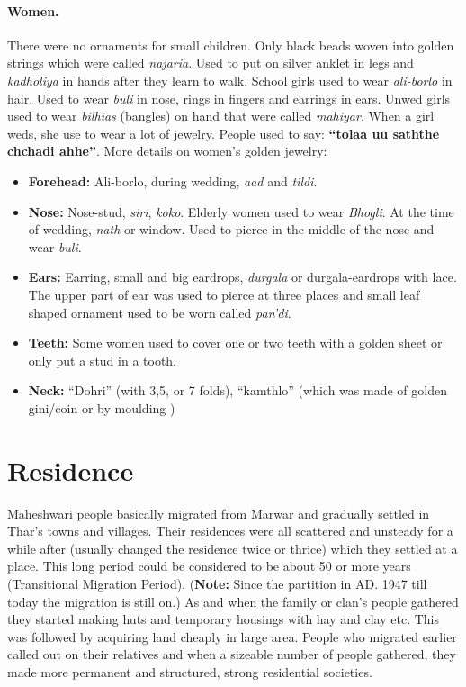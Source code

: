 \paragraph{Women.} There were no ornaments for small children. Only black beads
woven into golden strings which were called \textit{najaria}. Used to put on
silver anklet in legs and \textit{kadholiya} in hands after they learn to walk.
School girls used to wear \textit{ali-borlo} in hair. Used to wear \textit{buli}
in nose, rings in fingers and earrings in ears. Unwed girls used to wear
\textit{bilhias} (bangles) on hand that were called \textit{mahiyar}. When a
girl weds, she use to wear a lot of jewelry. People used to say: \textbf{``tolaa
uu saththe chchadi ahhe''}. More details on women's golden jewelry:
\begin{itemize}
 \item \textbf{Forehead:} Ali-borlo, during wedding, \textit{aad} and \textit{tildi}.
\item \textbf{Nose:} Nose-stud, \textit{siri}, \textit{koko}. Elderly women used
to wear \textit{Bhogli}. At the time of wedding, \textit{nath} or window. Used
to pierce in the middle of the nose and wear \textit{buli}.
\item \textbf{Ears:} Earring, small and big eardrops, \textit{durgala} or
durgala-eardrops with lace. The upper part of ear was used to pierce at three
places and small leaf shaped ornament used to be worn called \textit{pan'di}.
\item \textbf{Teeth:} Some women used to cover one or two teeth with a golden
sheet or only put a stud in a tooth.
\item \textbf{Neck:} ``Dohri'' (with 3,5, or 7 folds), ``kamthlo'' (which was
made of golden gini/coin or by moulding )
\end{itemize}

\section{Residence}
Maheshwari people basically migrated from Marwar and gradually settled in Thar's
towns and villages. Their residences were all scattered and unsteady for a while
after (usually changed the residence twice or thrice) which they settled at a
place. This long period could be considered to be about 50 or more years
(Transitional Migration Period). (\textbf{Note:} Since the partition in AD. 1947
till today the migration is still on.) As and when the family or clan's people
gathered they started making huts and temporary housings with hay and clay etc.
This was followed by acquiring land cheaply in large area. People who migrated
earlier called out on their relatives and when a sizeable number of people
gathered, they made more permanent and structured, strong residential societies.

